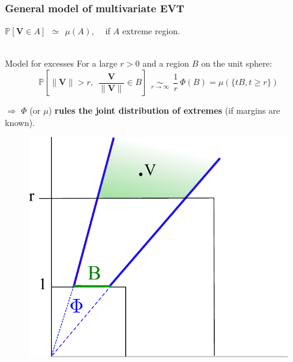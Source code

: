 \documentclass[9pt]{beamer}
\def\mb{\mathbf}
\begin{document}
\begin{frame}
\frametitle{General model of multivariate EVT}
%
$\mathbb{P} [\mb V \in A]~~\simeq~~\mu(A)$, ~~if $A$ extreme region.\\~\\

\begin{block}{ { Model} for excesses }
For a large $r>0$ and a region $B$ on the unit sphere: $$ \mathbb{P}\left[\|\mb V\|> r  ,~~\mb{\frac{V}{\|V\|}} \in B \right]  ~~\underset{r \to \infty}{\sim}~~  \frac{1}{r}\,\Phi(B)  = \mu(\{t B, t\ge r\})$$
\end{block}
\vspace*{.5cm}
$\Rightarrow$ $\Phi$ (or $\mu$) \textbf{rules the joint distribution of extremes} (if margins are known).
\begin{figure}[h]
\centering
\includegraphics[width=0.4\linewidth]{sourcefigs/phi.pdf}
\end{figure}
\end{frame}
\end{document}
